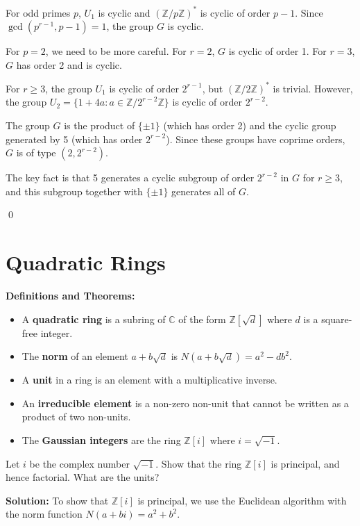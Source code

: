 For odd primes $p$, $U_1$ is cyclic and $(\mathbb{Z}/p\mathbb{Z})^*$ is cyclic of order $p-1$. Since $\gcd(p^{r-1}, p-1) = 1$, the group $G$ is cyclic.

For $p = 2$, we need to be more careful. For $r = 2$, $G$ is cyclic of order 1. For $r = 3$, $G$ has order 2 and is cyclic.

For $r \geq 3$, the group $U_1$ is cyclic of order $2^{r-1}$, but $(\mathbb{Z}/2\mathbb{Z})^*$ is trivial. However, the group $U_2 = \{1 + 4a : a \in \mathbb{Z}/2^{r-2}\mathbb{Z}\}$ is cyclic of order $2^{r-2}$.

The group $G$ is the product of $\{\pm 1\}$ (which has order 2) and the cyclic group generated by 5 (which has order $2^{r-2}$). Since these groups have coprime orders, $G$ is of type $(2, 2^{r-2})$.

The key fact is that 5 generates a cyclic subgroup of order $2^{r-2}$ in $G$ for $r \geq 3$, and this subgroup together with $\{\pm 1\}$ generates all of $G$.


\qed
\section{Quadratic Rings}

\noindent\textbf{Definitions and Theorems:}
\begin{itemize}
\item A \textbf{quadratic ring} is a subring of $\mathbb{C}$ of the form $\mathbb{Z}[\sqrt{d}]$ where $d$ is a square-free integer.
\item The \textbf{norm} of an element $a + b\sqrt{d}$ is $N(a + b\sqrt{d}) = a^2 - db^2$.
\item A \textbf{unit} in a ring is an element with a multiplicative inverse.
\item An \textbf{irreducible element} is a non-zero non-unit that cannot be written as a product of two non-units.
\item The \textbf{Gaussian integers} are the ring $\mathbb{Z}[i]$ where $i = \sqrt{-1}$.
\end{itemize}

\begin{problembox}
Let $i$ be the complex number $\sqrt{-1}$. Show that the ring $\mathbb{Z}[i]$ is principal, and hence factorial. What are the units?
\end{problembox}

\noindent\textbf{Solution:}
To show that $\mathbb{Z}[i]$ is principal, we use the Euclidean algorithm with the norm function $N(a + bi) = a^2 + b^2$.

